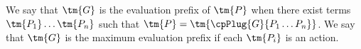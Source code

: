 \begin{definition}\label{def:hccp-maximum-evaluation-prefix}
  We say that $\tm{G}$ is the evaluation prefix of $\tm{P}$ when there exist terms
  $\tm{P_1} \dots \tm{P_n}$ such that $\tm{P} = \tm{\cpPlug{G}{P_1 \dots P_n}}$.
  We say that $\tm{G}$ is the maximum evaluation prefix if each $\tm{P_i}$ is an
  action. 
\end{definition}
